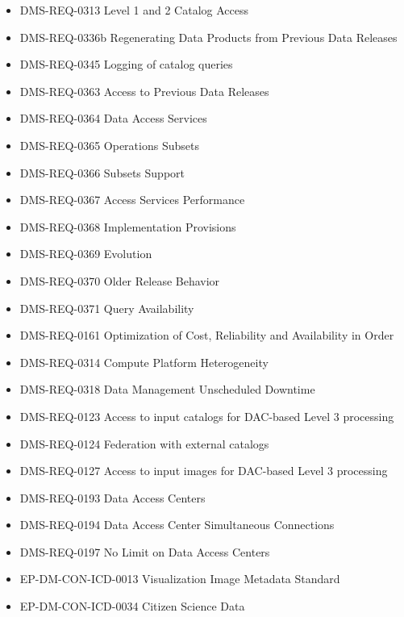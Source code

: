 \begin{itemize}
\item DMS-REQ-0313 Level 1 and 2 Catalog Access
\item DMS-REQ-0336b Regenerating Data Products from Previous Data Releases
\item DMS-REQ-0345 Logging of catalog queries
\item DMS-REQ-0363 Access to Previous Data Releases
\item DMS-REQ-0364 Data Access Services
\item DMS-REQ-0365 Operations Subsets
\item DMS-REQ-0366 Subsets Support
\item DMS-REQ-0367 Access Services Performance
\item DMS-REQ-0368 Implementation Provisions
\item DMS-REQ-0369 Evolution
\item DMS-REQ-0370 Older Release Behavior
\item DMS-REQ-0371 Query Availability
\item DMS-REQ-0161 Optimization of Cost, Reliability and Availability in Order
\item DMS-REQ-0314 Compute Platform Heterogeneity
\item DMS-REQ-0318 Data Management Unscheduled Downtime
\item DMS-REQ-0123 Access to input catalogs for DAC-based Level 3 processing
\item DMS-REQ-0124 Federation with external catalogs
\item DMS-REQ-0127 Access to input images for DAC-based Level 3 processing
\item DMS-REQ-0193 Data Access Centers
\item DMS-REQ-0194 Data Access Center Simultaneous Connections
\item DMS-REQ-0197 No Limit on Data Access Centers
\item EP-DM-CON-ICD-0013 Visualization Image Metadata Standard
\item EP-DM-CON-ICD-0034 Citizen Science Data
\end{itemize}
